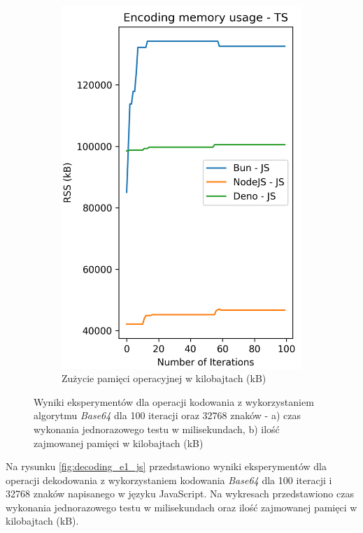 \begin{figure}[H]
\begin{subfigure}[b]{0.42\textwidth}
    \includegraphics[width=\textwidth]{Figures/coding/base64_100_encoding_js_memory.png}
    \caption{Zużycie pamięci operacyjnej w kilobajtach (kB)}
    \label{fig:encoding_e1_js_memory}
  \end{subfigure}
  \hfill
  \caption{Wyniki eksperymentów dla operacji kodowania z wykorzystaniem algorytmu \textit{Base64} dla 100 iteracji oraz 32768 znaków - a) czas wykonania jednorazowego testu w milisekundach, b) ilość zajmowanej pamięci w kilobajtach (kB)}
  \label{fig:encoding_e1_js}
\end{figure}

Na rysunku \ref{fig:decoding_e1_js} przedstawiono wyniki eksperymentów dla operacji dekodowania z wykorzystaniem kodowania \textit{Base64} dla 100 iteracji i 32768 znaków napisanego w języku JavaScript. Na wykresach przedstawiono czas wykonania jednorazowego testu w milisekundach oraz ilość zajmowanej pamięci w kilobajtach (kB).

